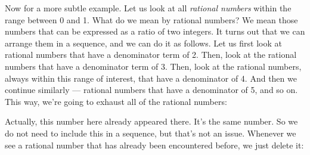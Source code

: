 \documentclass[pdftex, brazil, 12pt, twoside]{article}
\begin{document}
\begin{figure}[H]
  \begin{center}
  \end{center}
\end{figure}

Now for a more subtle example.
Let us look at all \emph{rational numbers} within the range
between 0 and 1.
What do we mean by rational numbers?
We mean those numbers that can be expressed as a
ratio of two integers.
It turns out that we can arrange them in a sequence,
and we can do it as follows.
Let us first look at rational numbers that have a
denominator term of 2.
Then, look at the rational numbers that have a
denominator term of 3.
Then, look at the rational numbers, always within this
range of interest, that have a denominator of 4.
And then we continue similarly ---
rational numbers that have a denominator of 5, and so on.
This way, we're going to exhaust all of
the rational numbers:

\begin{figure}[H]
  \begin{center}
  \end{center}
\end{figure}

Actually, this number here already appeared there.
It's the same number.
So we do not need to include this in a sequence, but that's
not an issue.
Whenever we see a rational number that has already been
encountered before, we just delete it:
\end{document}
